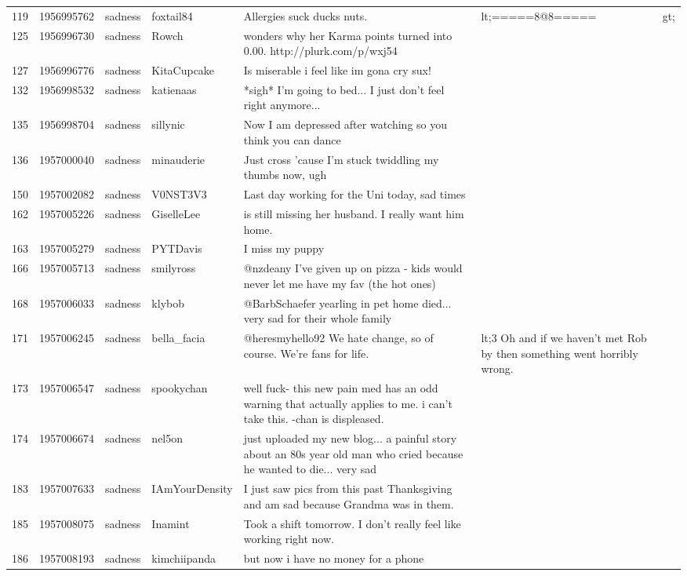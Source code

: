 \begin{tabular}{lrlll}
119 & 1956995762 & sadness & foxtail84 & Allergies suck ducks nuts.     &lt;=====8@8=====&gt; \\
125 & 1956996730 & sadness & Rowch & wonders why her Karma points turned into 0.00.  http://plurk.com/p/wxj54 \\
127 & 1956996776 & sadness & KitaCupcake & Is miserable  i feel like im gona cry  sux! \\
132 & 1956998532 & sadness & katienaas & *sigh* I'm going to bed... I just don't feel right anymore... \\
135 & 1956998704 & sadness & sillynic & Now I am depressed after watching so you think you can dance \\
136 & 1957000040 & sadness & minauderie & Just cross 'cause I'm stuck twiddling my thumbs now, ugh \\
150 & 1957002082 & sadness & V0NST3V3 & Last day working for the Uni today, sad times \\
162 & 1957005226 & sadness & GiselleLee & is still missing her husband.    I really want him home. \\
163 & 1957005279 & sadness & PYTDavis & I miss my puppy \\
166 & 1957005713 & sadness & smilyross & @nzdeany I've given up on pizza - kids would never let me have my fav  (the hot ones) \\
168 & 1957006033 & sadness & klybob & @BarbSchaefer yearling in pet home died... very sad for their whole family \\
171 & 1957006245 & sadness & bella_facia & @heresmyhello92 We hate change, so of course. We're fans for life. &lt;3 Oh and if we haven't met Rob by then something went horribly wrong. \\
173 & 1957006547 & sadness & spookychan & well fuck- this new pain med has an odd warning that actually applies to me. i can't take this. -chan is displeased. \\
174 & 1957006674 & sadness & nel5on & just uploaded my new blog... a painful story about an 80s year old man who cried because he wanted to die... very sad \\
183 & 1957007633 & sadness & IAmYourDensity & I just saw pics from this past Thanksgiving and am sad because Grandma was in them. \\
185 & 1957008075 & sadness & Inamint & Took a shift tomorrow.    I don't really feel like working right now. \\
186 & 1957008193 & sadness & kimchiipanda & but now i have no money for a phone \\

\end{tabular}
